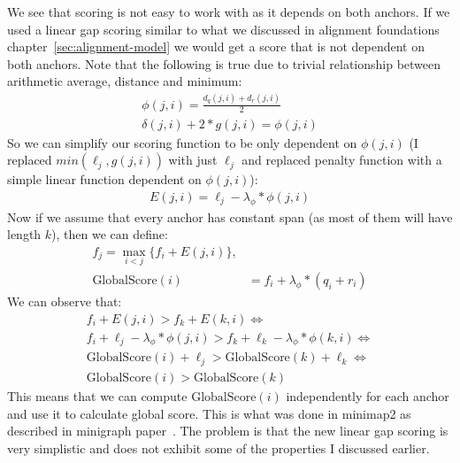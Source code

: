 We see that scoring is not easy to work with as it depends on both anchors. If we used a linear gap scoring similar to what we discussed in alignment foundations chapter~\ref{sec:alignment-model} we would get a score that is not dependent on both anchors.
Note that the following is true due to trivial relationship between arithmetic average, distance and minimum:
\begin{equation}
\begin{aligned}
  \phi(j, i) = \frac{d_q(j,i) + d_r(j,i)}{2} \\
  \delta(j,i) + 2*g(j,i) = \phi(j,i)
\end{aligned}
\end{equation}
So we can simplify our scoring function to be only dependent on $\phi(j,i)$ (I replaced $min(\ell_j, g(j,i))$ with just $\ell_j$ and replaced penalty function with a simple linear function dependent on $\phi(j,i)$):
\begin{equation}
\begin{aligned}
  E(j,i) = \ell_j - \lambda_{\phi} * \phi(j,i)
\end{aligned}
\end{equation}
Now if we assume that every anchor has constant span (as most of them will have length $k$), then we can define:
\begin{equation}
\begin{aligned}
  f_j = \max_{i < j}\{f_i+E(j,i)\}, \\
  \text{GlobalScore}(i) &= f_i + \lambda_{\phi} * (q_i + r_i)
\end{aligned}
\label{eq:global-score-definition-chaining-rmq}
\end{equation}
We can observe that:
\begin{equation}
\begin{aligned}
  f_i+E(j,i) > f_k+E(k,i) \iff \\
  f_i + \ell_j - \lambda_{\phi} * \phi(j,i) > f_k + \ell_k - \lambda_{\phi} * \phi(k,i) \iff \\
  \text{GlobalScore}(i) + \ell_j > \text{GlobalScore}(k) + \ell_k \iff \\
  \text{GlobalScore}(i) > \text{GlobalScore}(k)
\end{aligned}
\end{equation}
This means that we can compute $\text{GlobalScore}(i)$ independently for each anchor and use it to calculate global score.
This is what was done in minimap2 as described in minigraph paper~\cite{minimap2_rmq_scoring_minigraph}.
The problem is that the new linear gap scoring is very simplistic and does not exhibit some of the properties I discussed earlier.

